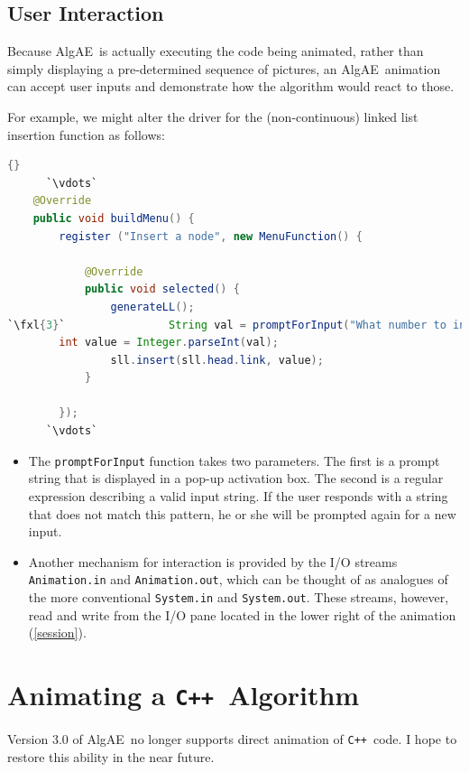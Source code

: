 \documentclass[11pt,titlepage]{book}
\def\fxl#1{%
\newdimen\fxlheight\setlength{\fxlheight}{#1\baselineskip}%
\advance\fxlheight by -0.5\baselineskip%
\begin{picture}(0,0)%
\setlength{\unitlength}{\baselineskip}%
\put(0,0){\makebox(0,0.75)[tl]{%
\colorbox{paleyellow}{%
\rule{0pt}{\fxlheight}%
\rule{\linewidth}{0pt}}%
}}\end{picture}%
}
\newcommand{\algae}{{\sc AlgAE}}
\newcommand{\cpp}{{\tt C++}}
\begin{document}
\section{User Interaction}\label{interaction}

Because \algae\ is actually executing the code being animated, rather
than simply displaying a pre-determined sequence of pictures, an
\algae\ animation can accept user inputs and demonstrate how the
algorithm would react to those.

For example, we might alter the driver for the (non-continuous) linked list insertion function as follows:
\begin{lstlisting}[language=Java,frame=tb]{}
      `\vdots`
    @Override
    public void buildMenu() {
        register ("Insert a node", new MenuFunction() {

            @Override
            public void selected() {
                generateLL();
`\fxl{3}`                String val = promptForInput("What number to insert?", "[0-9]+");
		int value = Integer.parseInt(val);
                sll.insert(sll.head.link, value);
            }
            
        });
      `\vdots`
\end{lstlisting}
\begin{itemize}
\item The \texttt{promptForInput} function takes two parameters. The
  first is a prompt string that is displayed in a pop-up activation
  box. The second is a regular expression describing a valid input
  string. If the user responds with a string that does not match this
  pattern, he or she will be prompted again for a new input.
\item Another mechanism for interaction is provided by the I/O streams
  \texttt{Animation.in} and \texttt{Animation.out}, which can be
  thought of as analogues of the more conventional \texttt{System.in} and
  \texttt{System.out}.
  These streams, however, read and write from the I/O pane located in 
  the lower right of the animation (\autoref{session}).
\end{itemize}






\chapter{Animating a \cpp\ Algorithm}

Version 3.0 of \algae\ no longer supports direct animation of
\cpp\ code. I hope to restore this ability in the near future.
\end{document}
